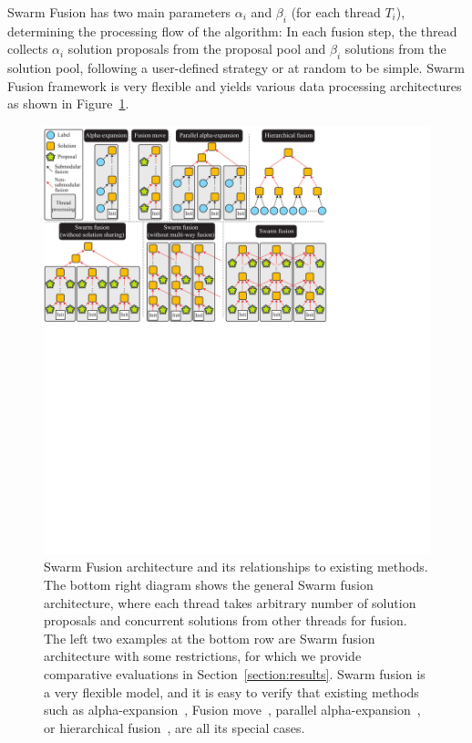 Swarm Fusion has two main parameters $\alpha_i$ and $\beta_i$ (for each
thread $T_i$), determining the processing flow of the algorithm: In each
fusion step, the thread collects $\alpha_i$ solution proposals from the
proposal pool and $\beta_i$ solutions from the solution pool, following
a user-defined strategy or at random to be simple.
%
Swarm Fusion framework is very flexible and yields various data
processing architectures as shown in Figure~\ref{fig:model}.
%
\begin{figure}[tb]
 \includegraphics[width=\columnwidth]{figure/model.pdf} \caption{Swarm
 Fusion architecture and its relationships to existing methods. The
 bottom right diagram shows the general Swarm fusion architecture, where
 each thread takes arbitrary number of solution proposals and concurrent
 solutions from other threads for fusion. The left two examples at the
 bottom row are Swarm fusion architecture with some restrictions, for
 which we provide comparative evaluations in
 Section~\ref{section:results}. Swarm fusion is a very flexible model,
 and it is easy to verify that existing methods such as
 alpha-expansion~\cite{alpha_expansion}, Fusion move~\cite{FM}, parallel
 alpha-expansion~\cite{delong}, or hierarchical
 fusion~\cite{delong_hierarchical_fusion,olga}, are all its special
 cases.}\label{fig:model}
\end{figure}
